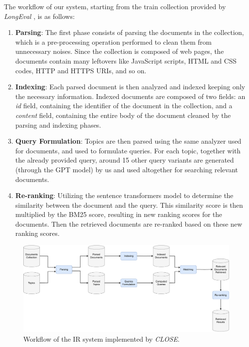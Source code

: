 The workflow of our system, starting from the train collection provided by \textit{LongEval} \cite{cleflongeval}, is as follows:
\begin{enumerate}
    \item \textbf{Parsing}: The first phase consists of parsing the documents in the collection, which is a pre-processing operation performed to clean them from unnecessary noises. Since the collection is composed of web pages, the documents contain many leftovers like JavaScript scripts, HTML and CSS codes, HTTP and HTTPS URIs, and so on.

    \item \textbf{Indexing}: Each parsed document is then analyzed and indexed keeping only the necessary information. Indexed documents are composed of two fields: an \textit{id} field, containing the identifier of the document in the collection, and a \textit{content} field, containing the entire body of the document cleaned by the parsing and indexing phases.

    \item \textbf{Query Formulation}: Topics are then parsed using the same analyzer used for documents, and used to formulate queries. For each topic, together with the already provided query, around 15 other query variants are generated (through the GPT model) by us and used altogether for searching relevant documents.

    \item \textbf{Re-ranking}: Utilizing the sentence transformers model to determine the similarity between the document and the query. This similarity score is then multiplied by the BM25 score, resulting in new ranking scores for the documents. Then the retrieved documents are re-ranked based on these new ranking scores.

\end{enumerate}

\begin{figure}[!h]
    \centering
    \includegraphics[width=\textwidth, height=\textheight, keepaspectratio]{figure/CLOSE_IR_Workflow (2).pdf}
    \caption{Workflow of the IR system implemented by \textit{CLOSE}.}
    \label{fig:CLOSE_IR_Workflow}
\end{figure}

